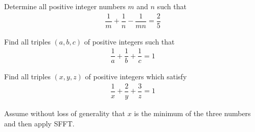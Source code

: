 \documentclass{subfile}
\begin{document}

	\begin{problem} %
		Determine all positive integer numbers $m$ and $n$ such that
			\begin{align*}
				\dfrac{1}{m}+\dfrac{1}{n}-\dfrac{1}{mn}=\dfrac{2}{5}
			\end{align*}
	\end{problem}

	\begin{problem} %
		Find all triples $(a,b,c)$ of positive integers such that
			\begin{align*}
				\dfrac{1}{a}+\dfrac{1}{b}+\dfrac{1}{c}=1
			\end{align*}
	\end{problem}

	\begin{problem} %
		Find all triples $(x,y,z)$ of positive integers which satisfy
			\begin{align*}
				\dfrac{1}{x}+\dfrac{2}{y}+\dfrac{3}{z}=1
			\end{align*}
	\end{problem}

	\begin{hint}
		Assume without loss of generality that $x$ is the minimum of the three numbers and then apply SFFT.
	\end{hint}
\end{document}
